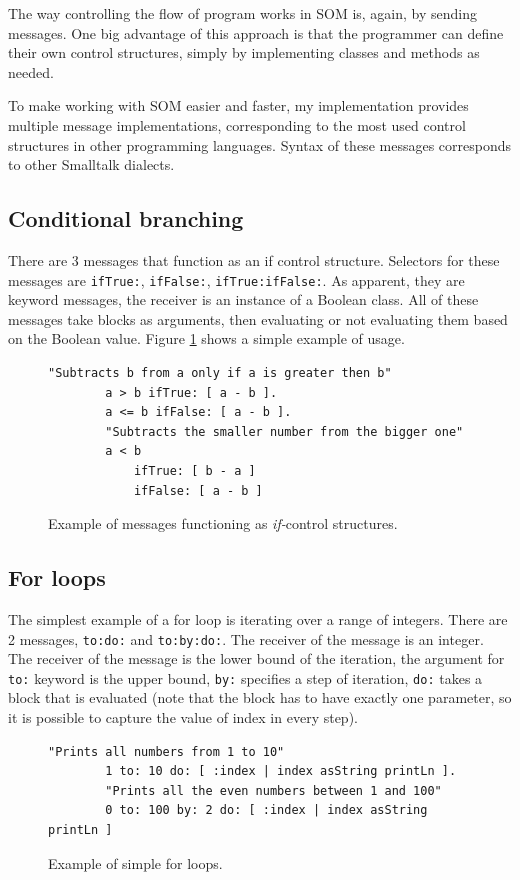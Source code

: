 \documentclass[thesis=M,english]{FITthesis}[2019/12/23]
\begin{document}
The way controlling the flow of program works in SOM is, again, by sending messages. One big advantage of this 
approach is that the programmer can define their own control structures, simply by implementing classes and
methods as needed.

To make working with SOM easier and faster, my implementation provides multiple message implementations, 
corresponding to the most used control structures in other programming languages. Syntax of these messages
corresponds to other Smalltalk dialects.

\subsection{Conditional branching}
There are 3 messages that function as an if control structure. Selectors for these messages are \texttt{ifTrue:},
\texttt{ifFalse:}, \texttt{ifTrue:ifFalse:}. As apparent, they are keyword messages, the receiver is an instance of
a Boolean class. All of these messages take blocks as arguments, then evaluating or not evaluating them based on
the Boolean value. Figure \ref{lst-if-control} shows a simple example of usage.

\begin{figure}[h!]
	\begin{lstlisting}[language=Smalltalk]
		"Subtracts b from a only if a is greater then b"
		a > b ifTrue: [ a - b ].
		a <= b ifFalse: [ a - b ].
		"Subtracts the smaller number from the bigger one"
		a < b
			ifTrue: [ b - a ]
			ifFalse: [ a - b ]
	\end{lstlisting}
	\caption{Example of messages functioning as \textit{if-}control structures.}
	\label{lst-if-control}
\end{figure}

\subsection{For loops}
The simplest example of a for loop is iterating over a range of integers. There are 2 messages, \texttt{to:do:} and  \texttt{to:by:do:}.
The receiver of the message is an integer. The receiver of the message is the lower bound of the iteration, the argument for \texttt{to:}
keyword is the upper bound, \texttt{by:} specifies a step of iteration, \texttt{do:} takes a block that is evaluated (note that the block
has to have exactly one parameter, so it is possible to capture the value of index in every step).

\begin{figure}[h!]
	\begin{lstlisting}[language=Smalltalk]
		"Prints all numbers from 1 to 10"
		1 to: 10 do: [ :index | index asString printLn ].
		"Prints all the even numbers between 1 and 100"
		0 to: 100 by: 2 do: [ :index | index asString printLn ]
	\end{lstlisting}
	\caption{Example of simple for loops.}
	\label{lst-for-index}
\end{figure}
\end{document}

